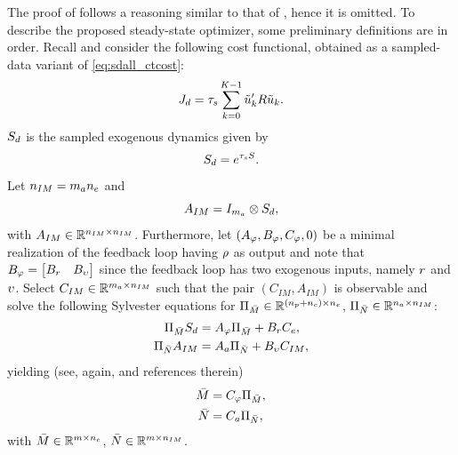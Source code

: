 The proof of  follows a reasoning similar to that of , hence it is omitted. To describe the proposed steady-state optimizer, some preliminary definitions are in order. Recall  and consider the following cost functional, obtained as a sampled-data variant of \eqref{eq:sdall_ctcost}:
\begin{equation}
  \label{eq:sdall_dtsscost}
  J_d = \tau_s\sum_{k=0}^{K-1} \tilde{u}_k'R\tilde{u}_k.
\end{equation}
$S_d$ is the sampled exogenous dynamics given by
\begin{equation}
  \label{eq:sdall_dexodynmat}
  S_d = e^{\tau_sS}.
\end{equation}
Let $n_{IM}=m_a{n_e}$ and
\begin{equation}
  \label{eq:sdall_Aim}
  A_{IM} = I_{m_a}\otimes S_d,
\end{equation}
with $A_{IM}\in\mathbb{R}^{n_{IM}\times n_{IM}}$.
Furthermore, let $(A_\varphi,B_\varphi,C_\varphi,0)$ be a minimal realization of the feedback loop having $\rho$ as output and note that $B_\varphi = \begin{bmatrix}B_r & B_\upsilon\end{bmatrix}$ since the feedback loop has two exogenous inputs, namely $r$ and $\upsilon$.
Select $C_{IM}\in\mathbb{R}^{m_a\times n_{IM}}$ such that the pair $(C_{IM},A_{IM})$ is observable and solve the following Sylvester equations for $\Pi_{\bar{M}}\in\mathbb{R}^{({n_p} + {n_c})\times{n_e}}$, $\Pi_{\bar{N}}\in\mathbb{R}^{n_a \times n_{IM}}$:
\begin{subequations}
  \label{eq:sdall_inv}
  \begin{align}
    \Pi_{\bar{M}}S_d &= A_\varphi\Pi_{\bar{M}} + B_{r}C_e,\label{eq:sdall_invmbar}\\
    \Pi_{\bar{N}}A_{IM} &= A_{a}\Pi_{\bar{N}} + B_{\upsilon}C_{IM},\label{eq:sdall_invnbar}
  \end{align}
\end{subequations}
yielding (see, again,  and references therein)
\begin{subequations}
  \label{eq:sdall_mandn}
  \begin{align}
    \bar{M} &= C_\varphi\Pi_{\bar{M}},\label{eq:mbar}\\
    \bar{N} &= C_{a}\Pi_{\bar{N}},\label{eq:nbar}
  \end{align}
\end{subequations}
with $\bar{M}\in\mathbb{R}^{m\times{n_e}}$, $\bar{N}\in\mathbb{R}^{m\times n_{IM}}$.

